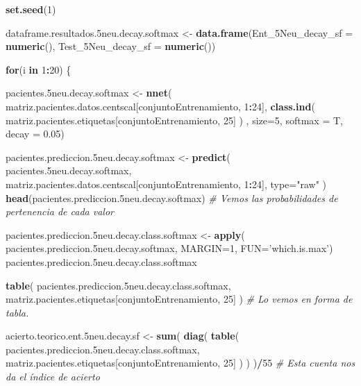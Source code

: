 \documentclass[]{article}
\newenvironment{Shaded}{\begin{snugshade}}{\end{snugshade}}
\newcommand{\KeywordTok}[1]{\textcolor[rgb]{0.13,0.29,0.53}{\textbf{#1}}}
\newcommand{\DataTypeTok}[1]{\textcolor[rgb]{0.13,0.29,0.53}{#1}}
\newcommand{\DecValTok}[1]{\textcolor[rgb]{0.00,0.00,0.81}{#1}}
\newcommand{\FloatTok}[1]{\textcolor[rgb]{0.00,0.00,0.81}{#1}}
\newcommand{\StringTok}[1]{\textcolor[rgb]{0.31,0.60,0.02}{#1}}
\newcommand{\CommentTok}[1]{\textcolor[rgb]{0.56,0.35,0.01}{\textit{#1}}}
\newcommand{\ControlFlowTok}[1]{\textcolor[rgb]{0.13,0.29,0.53}{\textbf{#1}}}
\newcommand{\OperatorTok}[1]{\textcolor[rgb]{0.81,0.36,0.00}{\textbf{#1}}}
\newcommand{\NormalTok}[1]{#1}
\begin{document}
\begin{Shaded}
\begin{Highlighting}[]
\KeywordTok{set.seed}\NormalTok{(}\DecValTok{1}\NormalTok{)}

\NormalTok{dataframe.resultados.5neu.decay.softmax <-}\StringTok{ }\KeywordTok{data.frame}\NormalTok{(}\DataTypeTok{Ent_5Neu_decay_sf =} \KeywordTok{numeric}\NormalTok{(),}
                                                      \DataTypeTok{Test_5Neu_decay_sf =} \KeywordTok{numeric}\NormalTok{())}

\ControlFlowTok{for}\NormalTok{(i }\ControlFlowTok{in} \DecValTok{1}\OperatorTok{:}\DecValTok{20}\NormalTok{)}
\NormalTok{\{}


\NormalTok{  pacientes.5neu.decay.softmax <-}\StringTok{ }\KeywordTok{nnet}\NormalTok{( matriz.pacientes.datos.centscal[conjuntoEntrenamiento, }\DecValTok{1}\OperatorTok{:}\DecValTok{24}\NormalTok{], }\KeywordTok{class.ind}\NormalTok{( matriz.pacientes.etiquetas[conjuntoEntrenamiento, }\DecValTok{25}\NormalTok{] ) , }\DataTypeTok{size=}\DecValTok{5}\NormalTok{, }\DataTypeTok{softmax =}\NormalTok{ T, }\DataTypeTok{decay =} \FloatTok{0.05}\NormalTok{)}
  
\NormalTok{  pacientes.prediccion.5neu.decay.softmax <-}\StringTok{ }\KeywordTok{predict}\NormalTok{( pacientes.5neu.decay.softmax, matriz.pacientes.datos.centscal[conjuntoEntrenamiento, }\DecValTok{1}\OperatorTok{:}\DecValTok{24}\NormalTok{], }\DataTypeTok{type=}\StringTok{"raw"}\NormalTok{ )}
  \KeywordTok{head}\NormalTok{(pacientes.prediccion.5neu.decay.softmax) }\CommentTok{# Vemos las probabilidades de pertenencia de cada valor}
  
\NormalTok{  pacientes.prediccion.5neu.decay.class.softmax <-}\StringTok{ }\KeywordTok{apply}\NormalTok{( pacientes.prediccion.5neu.decay.softmax, }\DataTypeTok{MARGIN=}\DecValTok{1}\NormalTok{, }\DataTypeTok{FUN=}\StringTok{'which.is.max'}\NormalTok{)}
\NormalTok{  pacientes.prediccion.5neu.decay.class.softmax}
  
  \KeywordTok{table}\NormalTok{( pacientes.prediccion.5neu.decay.class.softmax, matriz.pacientes.etiquetas[conjuntoEntrenamiento, }\DecValTok{25}\NormalTok{] )  }\CommentTok{# Lo vemos en forma de tabla.}
  
\NormalTok{  acierto.teorico.ent.5neu.decay.sf <-}\StringTok{ }\KeywordTok{sum}\NormalTok{( }\KeywordTok{diag}\NormalTok{( }\KeywordTok{table}\NormalTok{( pacientes.prediccion.5neu.decay.class.softmax, matriz.pacientes.etiquetas[conjuntoEntrenamiento, }\DecValTok{25}\NormalTok{] ) ) )}\OperatorTok{/}\DecValTok{55} \CommentTok{# Esta cuenta nos da el índice de acierto}
  

\end{Highlighting}
\end{Shaded}
\end{document}
